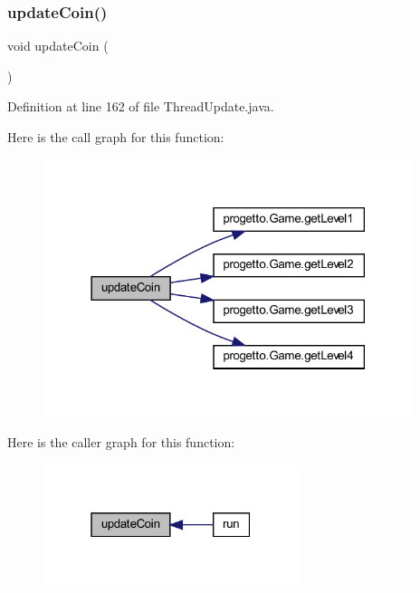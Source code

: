 \subsubsection{\texorpdfstring{update\+Coin()}{updateCoin()}}
{\footnotesize\ttfamily void update\+Coin (\begin{DoxyParamCaption}{ }\end{DoxyParamCaption})}



Definition at line 162 of file Thread\+Update.\+java.

Here is the call graph for this function\+:\nopagebreak
\begin{figure}[H]
\begin{center}
\leavevmode
\includegraphics[width=306pt]{classprogetto_1_1_thread_update_a7ca93fcd8c7440e7b3f64c595a5be28c_cgraph}
\end{center}
\end{figure}
Here is the caller graph for this function\+:\nopagebreak
\begin{figure}[H]
\begin{center}
\leavevmode
\includegraphics[width=211pt]{classprogetto_1_1_thread_update_a7ca93fcd8c7440e7b3f64c595a5be28c_icgraph}
\end{center}
\end{figure}
\mbox{\label{classprogetto_1_1_thread_update_af005ec68c869a6acd5e833cba9330a50}} 
